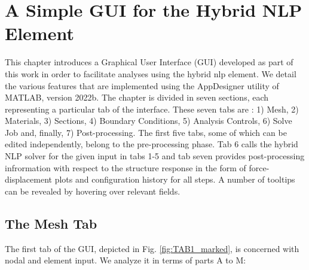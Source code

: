 \chapter{A Simple GUI for the Hybrid NLP Element}

This chapter introduces a Graphical User Interface (GUI) developed as part of 
this work in order to 
facilitate analyses using the hybrid \acrshort{nlp} element. We detail the 
various features that are implemented using the AppDesigner utility of MATLAB, 
version 2022b. The chapter is divided in seven sections, each representing a 
particular tab of the interface. These seven tabs are : 1) Mesh, 2) Materials, 
3) Sections, 4) Boundary Conditions, 5) Analysis Controls, 6) Solve Job and, 
finally, 7) Post-processing. The first five tabs, some of which can be edited 
independently, belong to the pre-processing phase. Tab 6 calls the hybrid NLP 
solver for the given input in tabs 1-5 and tab seven provides post-processing 
infrormation with respect to the structure response in the form of 
force-displacement plots and  configuration history for all steps. A number of 
tooltips can be revealed by hovering over relevant fields.

\section{The Mesh Tab}

The first tab of the GUI, depicted in Fig. \ref{fig:TAB1_marked}, is concerned 
with nodal and element input. We analyze it in terms of parts A to M:

